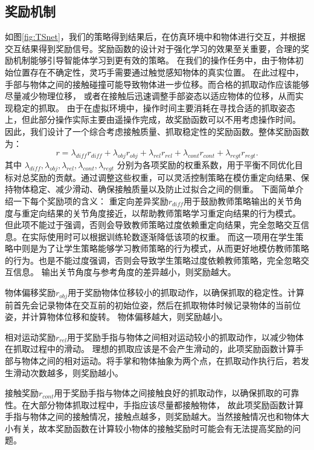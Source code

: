 \subsection{奖励机制}
如图\ref{fig:TSnet}，我们的策略得到结果后，在仿真环境中和物体进行交互，并根据交互结果得到奖励信号。奖励函数的设计对于强化学习的效果至关重要，合理的奖励机制能够引导智能体学习到更有效的策略。
在我们的操作任务中，由于物体初始位置存在不确定性，灵巧手需要通过触觉感知物体的真实位置。
在此过程中，手部与物体之间的接触碰撞可能导致物体进一步位移。而合格的抓取动作应该能够尽量减少物理位移，
或者在接触后迅速调整手部姿态以适应物体的位移，从而实现稳定的抓取。
由于在虚拟环境中，操作时间主要消耗在寻找合适的抓取姿态上，但此部分操作实际主要由遥操作完成，故奖励函数可以不用考虑操作时间。
因此，我们设计了一个综合考虑接触质量、抓取稳定性的奖励函数。整体奖励函数为：
\begin{equation}
r = \lambda_{diff} r_{diff} + \lambda_{obj} r_{obj} + \lambda_{rel} r_{rel} + \lambda_{cont} r_{cont} + \lambda_{regt} r_{regt}.
\end{equation}
其中 $\lambda_{diff}, \lambda_{obj}, \lambda_{rel}, \lambda_{cont}, \lambda_{regt}$ 分别为各项奖励的权重系数，用于平衡不同优化目标对总奖励的贡献。通过调整这些权重，可以灵活控制策略在模仿重定向结果、保持物体稳定、减少滑动、确保接触质量以及防止过拟合之间的侧重。
下面简单介绍一下每个奖励项的含义：
重定向差异奖励$r_{diff}$用于鼓励教师策略输出的关节角度与重定向结果的关节角度接近，以帮助教师策略学习重定向结果的行为模式。
但此项不能过于强调，否则会导致教师策略过度依赖重定向结果，完全忽略交互信息。在实际使用时可以根据训练轮数逐渐降低该项的权重。
而这一项用在学生策略中则是为了让学生策略能够学习教师策略的行为模式，从而更好地模仿教师策略的行为。也是不能过度强调，否则会导致学生策略过度依赖教师策略，完全忽略交互信息。
输出关节角度与参考角度的差异越小，则奖励越大。

物体偏移奖励$r_{obj}$用于奖励物体位移较小的抓取动作，以确保抓取的稳定性。计算前首先会记录物体在交互前的初始位姿，然后在抓取物体时候记录物体的当前位姿，并计算物体位移和旋转。
物体偏移越大，则奖励越小。

相对运动奖励$r_{rel}$用于奖励手指与物体之间相对运动较小的抓取动作，以减少物体在抓取过程中的滑动。
理想的抓取应该是不会产生滑动的，此项奖励函数计算手部与物体之间的相对运动。将手掌和物体抽象为两个点，在抓取动作执行后，若发生滑动次数越多，则奖励越小。

接触奖励$r_{cont}$用于奖励手指与物体之间接触良好的抓取动作，以确保抓取的可靠性。在大部分物体抓取过程中，手指应该尽量都接触物体，
故此项奖励函数计算手指与物体之间的接触情况，接触点越多，则奖励越大。当然接触情况也和物体大小有关，故本奖励函数在计算较小物体的接触奖励时可能会有无法提高奖励的问题。

